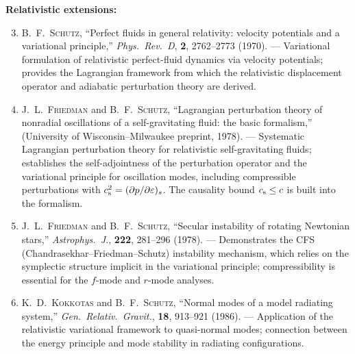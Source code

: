 \medskip
\noindent\textbf{Relativistic extensions:}
\begin{enumerate}\setcounter{enumi}{2}
\item B.~F.~\textsc{Schutz},
  ``Perfect fluids in general relativity: velocity potentials and a
  variational principle,''
  \emph{Phys.\ Rev.\ D}, \textbf{2}, 2762--2773 (1970).
  --- Variational formulation of relativistic perfect-fluid dynamics
  via velocity potentials; provides the Lagrangian framework from
  which the relativistic displacement operator and adiabatic
  perturbation theory are derived.  \cite{Schutz1970}

\item J.~L.~\textsc{Friedman} and B.~F.~\textsc{Schutz},
  ``Lagrangian perturbation theory of nonradial oscillations of a
  self-gravitating fluid: the basic formalism,''
  (University of Wisconsin--Milwaukee preprint, 1978).
  --- Systematic Lagrangian perturbation theory for relativistic
  self-gravitating fluids; establishes the self-adjointness of the
  perturbation operator and the variational principle for
  oscillation modes, including compressible perturbations with
  $c_{\mathrm{s}}^{2} = (\partial p/\partial\varepsilon)_{s}$.  The causality
  bound $c_{\mathrm{s}} \le c$ is built into the formalism.
  \cite{FriedmanSchutz1978}

\item J.~L.~\textsc{Friedman} and B.~F.~\textsc{Schutz},
  ``Secular instability of rotating Newtonian stars,''
  \emph{Astrophys.\ J.}, \textbf{222}, 281--296 (1978).
  --- Demonstrates the CFS (Chandrasekhar--Friedman--Schutz)
  instability mechanism, which relies on the symplectic structure
  implicit in the variational principle; compressibility is essential
  for the $f$-mode and $r$-mode analyses.  \cite{FriedmanSchutz1978b}

\item K.~D.~\textsc{Kokkotas} and B.~F.~\textsc{Schutz},
  ``Normal modes of a model radiating system,''
  \emph{Gen.\ Relativ.\ Gravit.}, \textbf{18}, 913--921 (1986).
  --- Application of the relativistic variational framework to
  quasi-normal modes; connection between the energy principle and
  mode stability in radiating configurations.
  \cite{Kokkotas1986}
\end{enumerate}

